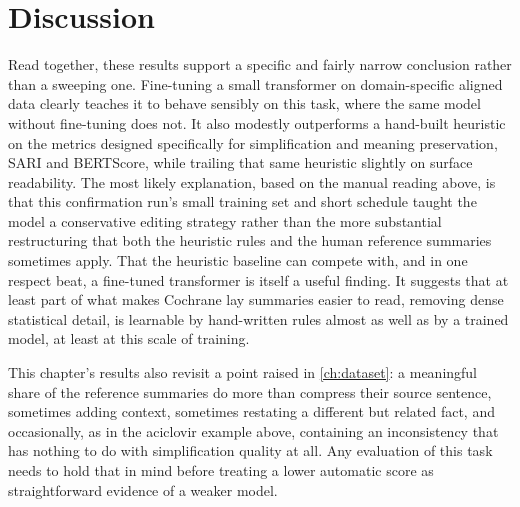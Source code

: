 \section{Discussion}
\label{sec:discussion}

Read together, these results support a specific and fairly narrow conclusion rather than a sweeping one. Fine-tuning a small transformer on domain-specific aligned data clearly teaches it to behave sensibly on this task, where the same model without fine-tuning does not. It also modestly outperforms a hand-built heuristic on the metrics designed specifically for simplification and meaning preservation, SARI and BERTScore, while trailing that same heuristic slightly on surface readability. The most likely explanation, based on the manual reading above, is that this confirmation run's small training set and short schedule taught the model a conservative editing strategy rather than the more substantial restructuring that both the heuristic rules and the human reference summaries sometimes apply. That the heuristic baseline can compete with, and in one respect beat, a fine-tuned transformer is itself a useful finding. It suggests that at least part of what makes Cochrane lay summaries easier to read, removing dense statistical detail, is learnable by hand-written rules almost as well as by a trained model, at least at this scale of training.

This chapter's results also revisit a point raised in \cref{ch:dataset}: a meaningful share of the reference summaries do more than compress their source sentence, sometimes adding context, sometimes restating a different but related fact, and occasionally, as in the aciclovir example above, containing an inconsistency that has nothing to do with simplification quality at all. Any evaluation of this task needs to hold that in mind before treating a lower automatic score as straightforward evidence of a weaker model.
